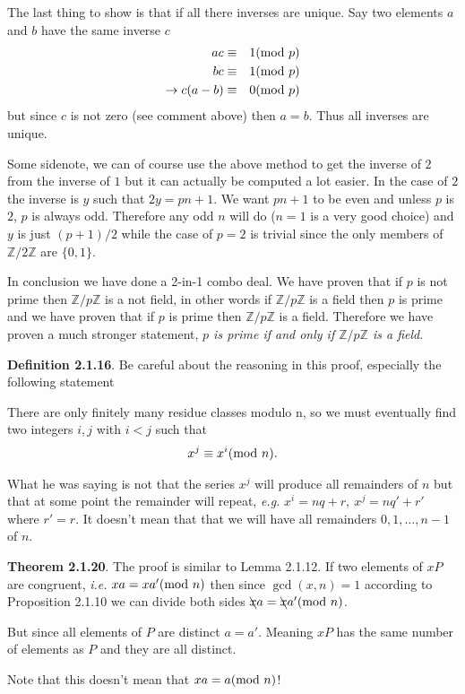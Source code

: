 \documentclass[aps,preprint,preprintnumbers,nofootinbib,showpacs,prd]{revtex4-1}
\newcommand{\ie}{{\it i.e.} }
\newcommand{\eg}{{\it e.g.} }
\newcommand{\nbea}{\begin{eqnarray*}}
\newcommand{\neea}{\end{eqnarray*}}
\begin{document}
The last thing to show is that if all there inverses are unique. Say two elements $a$ and $b$ have the same inverse $c$
%
\nbea
ac & \equiv & 1 ({\rm mod~} p) \\
bc & \equiv & 1 ({\rm mod~} p) \\
\to c(a-b) & \equiv & 0 ({\rm mod~} p)
\neea
%
but since $c$ is not zero (see comment above) then $a=b$. Thus all inverses are unique.

Some sidenote, we can of course use the above method to get the inverse of $2$ from the inverse of $1$ but it can actually be computed a lot easier. In the case of $2$ the inverse is $y$ such that $2y = pn +  1$. We want $pn + 1$ to be even and unless $p$ is $2$, $p$ is always odd. Therefore any odd $n$ will do ($n=1$ is a very good choice) and $y$ is just $(p+1)/2$ while the case of $p=2$ is trivial since the only members of $\mathbb{Z}/2\mathbb{Z}$ are $\{0,1\}$.

In conclusion we have done a 2-in-1 combo deal. We have proven that if $p$ is not prime then $\mathbb{Z}/p\mathbb{Z}$ is a not field, in other words if $\mathbb{Z}/p\mathbb{Z}$ is a field then $p$ is prime and we have proven that if $p$ is prime then $\mathbb{Z}/p\mathbb{Z}$ is a field. Therefore we have proven a much stronger statement, {\it $p$ is prime if and only if $\mathbb{Z}/p\mathbb{Z}$ is a field}.

{\bf Definition 2.1.16}. Be careful about the reasoning in this proof, especially the following statement

There are only finitely many residue classes modulo n, so we must eventually ﬁnd two integers $i, j$ with $i < j$ such that
%
\nbea
x^j \equiv x^i ({\rm mod~} n).
\neea
%

What he was saying is not that the series $x^j$ will produce all remainders of $n$ but that at some point the remainder will repeat, \eg $x^i = nq + r,~x^j = nq' + r'$ where $r' = r$. It doesn't mean that that we will have all remainders $0,1, \dots, n-1$ of $n$.

{\bf Theorem 2.1.20}. The proof is similar to Lemma 2.1.12. If two elements of $xP$ are congruent, \ie $xa = xa' ({\rm mod~} n)$ then since $\gcd(x,n)=1$ according to Proposition 2.1.10 we can divide both sides $\bcancel{x}a = \bcancel{x}a' ({\rm mod~} n)$.

But since all elements of $P$ are distinct $a = a'$. Meaning $xP$ has the same number of elements as $P$ and they are all distinct.

Note that this doesn't mean that $xa = a ({\rm mod~} n)$!
\end{document}
